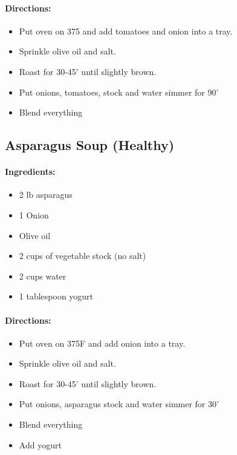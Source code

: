 \documentclass{article}
\begin{document}
\paragraph{Directions:}
\begin{itemize}
    \item Put oven on 375 and add tomatoes and onion into a tray.
    \item Sprinkle olive oil and salt.
    \item Roast for 30-45' until slightly brown.
    \item Put onions, tomatoes, stock and water simmer for 90'
    \item Blend everything
\end{itemize}

\subsection{Asparagus Soup (Healthy)}

\paragraph{Ingredients:}
\begin{itemize}
    \item 2 lb asparagus
    \item 1 Onion
    \item Olive oil
    \item 2 cups of vegetable stock (no salt)
    \item 2 cups water
    \item 1 tablespoon yogurt
\end{itemize}

\paragraph{Directions:}
\begin{itemize}
    \item Put oven on 375F and add onion into a tray.
    \item Sprinkle olive oil and salt.
    \item Roast for 30-45' until slightly brown.
    \item Put onions, asparagus stock and water simmer for 30'
    \item Blend everything
    \item Add yogurt
\end{itemize}
\end{document}
